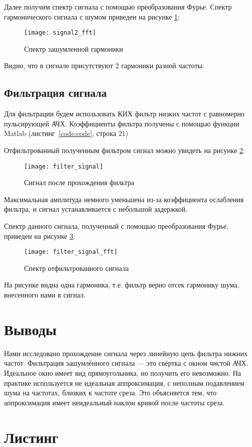 Далее получим спектр сигнала с помощью преобразования Фурье. Спектр гармонического сигнала с шумом приведен на рисунке \ref{pic:signal2_fft}:
\begin{figure}[H]
	\begin{center}
		\texttt{[image: signal2\_fft]}
		\caption{Спектр зашумленной гармоники} 
		\label{pic:signal2_fft} %
	\end{center}
\end{figure}
Видно, что в сигнале присутствуют 2 гармоники разной частоты.

\subsection{Фильтрация сигнала}

Для фильтрации будем использовать КИХ фильтр низких частот с равномерно пульсирующей АЧХ. 
Коэффициенты фильтра получены с помощью функции Matlab (листинг~\ref{code:code}, строка 21)

Отфильтрованный полученным фильтром сигнал можно увидеть на рисунке \ref{pic:filter_signal}:
\begin{figure}[H]
	\begin{center}
		\texttt{[image: filter\_signal]}
		\caption{Сигнал после прохождения фильтра} 
		\label{pic:filter_signal} %
	\end{center}
\end{figure}
Максимальная амплитуда немного уменьшена из-за коэффициента ослабления фильтра, и сигнал устанавливается с небольшой задержкой.

Спектр данного сигнала, полученный с помощью преобразования Фурье, приведен на рисунке \ref{pic:filter_signal_fft}:
\begin{figure}[H]
	\begin{center}
		\texttt{[image: filter\_signal\_fft]}
		\caption{Спектр отфильтрованного сигнала} 
		\label{pic:filter_signal_fft} %
	\end{center}
\end{figure}
На рисунке видна одна гармоника, т.е. фильтр верно отсек гармонику шума, внесенного нами в сигнал.

\section{Выводы}

Нами исследовано прохождение сигнала через линейную цепь фильтра нижних частот.
Фильтрация зашумлённого сигнала --- это свёртка с окном чистой АЧХ.
Идеальное окно имеет вид прямоугольника, но получить его невозможно. 
На практике используется не идеальная аппроксимация, с неполным подавлением 
шума на частотах, близких к частоте среза. 
Это объясняется тем, что аппроксимация имеет неидеальный наклон кривой после частоты среза.

\section{Листинг}

\parindent=1cm


\parindent=1cm

